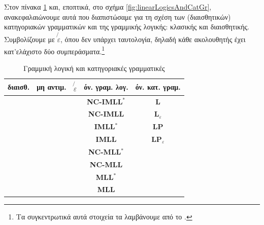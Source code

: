 \documentclass [a4paper,11pt] {book}
\newcommand{\tickYes}{\ding{52}}
\newcommand{\tickNo}{\hspace{1pt}\ding{55}}
\theoremstyle{definition}
\theoremstyle{definition}
\begin{document}
Στον πίνακα \ref{tab:LinearLogic&CatGr} και, εποπτικά, στο σχήμα \ref{fig:linearLogicsAndCatGr}, ανακεφαλαιώνουμε αυτά που διαπιστώσαμε για τη σχέση των (διαισθητικών) κατηγοριακών γραμματικών και της γραμμικής λογικής: κλασικής και διαισθητικής. Συμβολίζουμε με $\not{\varepsilon}$, όπου δεν υπάρχει ταυτολογία, δηλαδή κάθε ακολουθητής έχει κατ'ελάχιστο δύο συμπεράσματα.\footnote{Τα συγκεντρωτικά αυτά στοιχεία τα λαμβάνουμε από το \citep{Retore02}.}

\begin{table}[H]
\centering
\begin{tabular}{ccccc}
διαισθ. & μη αντιμ. & $\not{\varepsilon}$ & όν. γραμ. λογ. & όν. κατ. γραμ.
\\
\hline
\tickYes & \tickYes & \tickYes & \textbf{NC-IMLL}$^{*}$ & \textbf{L} \\
\tickYes & \tickYes & \tickNo & \textbf{NC-IMLL} & \textbf{L}$_{\varepsilon}$ \\
\tickYes & \tickNo & \tickYes & \textbf{IMLL}$^{*}$ & \textbf{LP} \\
\tickYes & \tickNo & \tickNo&  \textbf{IMLL} & \textbf{LP}$_{\varepsilon}$ \\
\tickNo & \tickYes & \tickYes & \textbf{NC-MLL}$^{*}$ \\
\tickNo & \tickYes & \tickNo & \textbf{NC-MLL} \\
\tickNo & \tickNo & \tickYes & \textbf{MLL}$^{*}$ \\
\tickNo & \tickNo & \tickNo & \textbf{MLL}
\end{tabular}
\caption{Γραμμική λογική και κατηγοριακές γραμματικές}
\label{tab:LinearLogic&CatGr}
\end{table}
\end{document}
